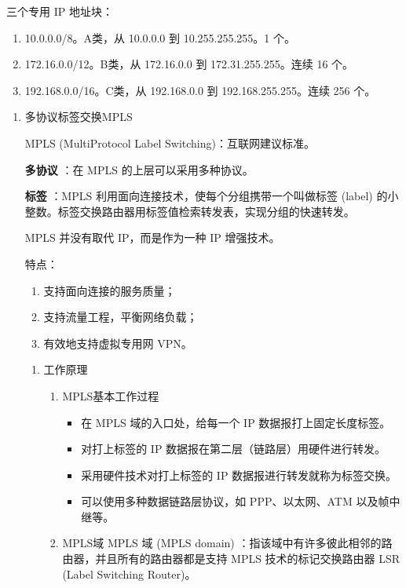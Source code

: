 \documentclass[11pt]{article}
\begin{document}
三个专用 IP 地址块：
\begin{enumerate}
\item 10.0.0.0/8。A类，从 10.0.0.0 到 10.255.255.255。1 个。
\item 172.16.0.0/12。B类，从 172.16.0.0 到 172.31.255.255。连续 16 个。
\item 192.168.0.0/16。C类，从 192.168.0.0 到 192.168.255.255。连续 256 个。
\end{enumerate}
\begin{enumerate}
\item 多协议标签交换MPLS
\label{sec:orgc41f855}

MPLS (MultiProtocol Label Switching)：互联网建议标准。

\textbf{多协议} ：在 MPLS 的上层可以采用多种协议。

\textbf{标签} ：MPLS 利用面向连接技术，使每个分组携带一个叫做标签 (label) 的小整数。标签交换路由器用标签值检索转发表，实现分组的快速转发。

MPLS 并没有取代 IP，而是作为一种 IP 增强技术。

特点：
\begin{enumerate}
\item 支持面向连接的服务质量；
\item 支持流量工程，平衡网络负载；
\item 有效地支持虚拟专用网 VPN。
\end{enumerate}
\begin{enumerate}
\item 工作原理
\label{sec:org97903c9}

\begin{enumerate}
\item MPLS基本工作过程

\begin{itemize}
\item 在 MPLS 域的入口处，给每一个 IP 数据报打上固定长度标签。

\item 对打上标签的 IP 数据报在第二层（链路层）用硬件进行转发。

\item 采用硬件技术对打上标签的 IP 数据报进行转发就称为标签交换。

\item 可以使用多种数据链路层协议，如 PPP、以太网、ATM 以及帧中继等。
\end{itemize}

\item MPLS域
MPLS 域 (MPLS domain) ：指该域中有许多彼此相邻的路由器，并且所有的路由器都是支持 MPLS 技术的标记交换路由器 LSR (Label Switching Router)。


\end{enumerate}
\end{enumerate}
\end{enumerate}
\end{document}
